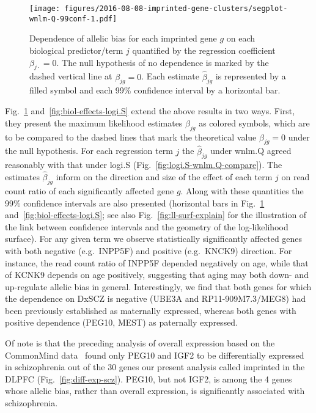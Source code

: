 \documentclass[12pt,letterpaper]{article}
\begin{document}
\begin{figure}
\begin{center}
\texttt{[image: figures/2016-08-08-imprinted-gene-clusters/segplot-wnlm-Q-99conf-1.pdf]}
\end{center}
\caption{ 
Dependence of allelic bias for each imprinted gene \(g\)
on each biological predictor/term \(j\) quantified by the regression coefficient
\(\beta_{j\cdot} = 0\).  The null hypothesis of no dependence is marked by the dashed
vertical line at \(\beta_{jg}=0\).  Each estimate \(\hat{\beta}_{jg}\) is
represented by a filled symbol and each 99\% confidence interval by a horizontal
bar.
}
\label{fig:biol-effects-wnlm.Q}
\end{figure}

Fig.~\ref{fig:biol-effects-wnlm.Q} and~\ref{fig:biol-effects-logi.S} extend
the above results in two ways. First, they present the maximum likelihood
estimates \(\hat\beta_{jg}\) as colored symbols, which are to be compared to
the dashed lines that mark the theoretical value \(\beta_{jg} = 0\) under the
null hypothesis.  For each regression term \(j\) the \(\hat\beta_{jg}\) under
wnlm.Q agreed reasonably with that under logi.S
(Fig.~\ref{fig:logi.S-wnlm.Q-compare}).  The estimates \(\hat\beta_{jg}\)
inform on the direction and size of the effect of each term \(j\) on read
count ratio of each significantly affected gene \(g\).  Along with these
quantities the 99\% confidence intervals are also presented (horizontal bars
in Fig.~\ref{fig:biol-effects-wnlm.Q} and~\ref{fig:biol-effects-logi.S}; see
also Fig.~\ref{fig:ll-surf-explain} for the illustration of the link between
confidence intervals and the geometry of the log-likelihood surface). For any
given term we observe statistically significantly affected genes with both
negative (e.g.~INPP5F) and positive (e.g.~KNCK9) direction.  For instance, the
read count ratio of INPP5F depended negatively on age, while that of KCNK9
depends on age positively, suggesting that aging may both down- and
up-regulate allelic bias in general. Interestingly, we find that both genes
for which the dependence on DxSCZ is negative (UBE3A and RP11-909M7.3/MEG8)
had been previously established as maternally expressed, whereas both genes
with positive dependence (PEG10, MEST) as paternally expressed.

Of note is that the preceding analysis of overall expression based on the
CommonMind data~\cite{Fromer2016a} found only PEG10 and IGF2 to be
differentially expressed in schizophrenia out of the 30 genes our present
analysis called imprinted in the DLPFC (Fig.~\ref{fig:diff-exp-scz}). PEG10,
but not IGF2, is among the 4 genes whose allelic bias, rather than overall
expression, is significantly associated with schizophrenia.
\end{document}

